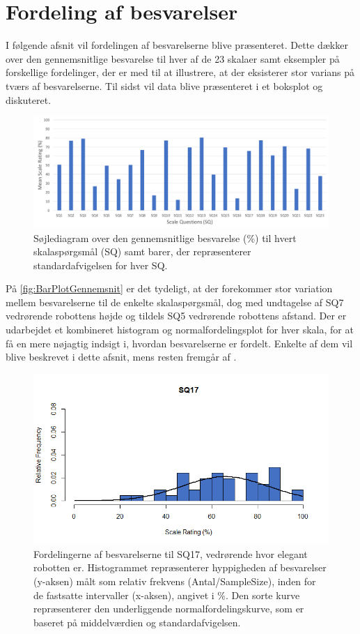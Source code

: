 \section{Fordeling af besvarelser}
\label{TestAfSkalaFordeling}
%
I følgende afsnit vil fordelingen af besvarelserne blive præsenteret. Dette dækker over den gennemsnitlige besvarelse til hver af de 23 skalaer samt eksempler på forskellige fordelinger, der er med til at illustrere, at der eksisterer stor varians på tværs af besvarelserne. Til sidst vil data blive præsenteret i et boksplot og diskuteret.
%
\begin{figure}[H]
\centering
\includegraphics[width = \textwidth]{Figure/DatabehandlingSkalaer/DataPresentation/MeanBarplot} 
 \caption{Søjlediagram over den gennemsnitlige besvarelse (\%) til hvert skalaspørgsmål (SQ) samt barer, der repræsenterer standardafvigelsen for hver SQ.}
\label{fig:BarPlotGennemsnit}
\end{figure}
\noindent
%
På \autoref{fig:BarPlotGennemsnit} er det tydeligt, at der forekommer stor variation mellem besvarelserne til de enkelte skalaspørgsmål, dog med undtagelse af SQ7 vedrørende robottens højde og tildels SQ5 vedrørende robottens afstand. Der er udarbejdet et kombineret histogram og normalfordelingsplot for hver skala, for at få en mere nøjagtig indsigt i, hvordan besvarelserne er fordelt. Enkelte af dem vil blive beskrevet i dette afsnit, mens resten fremgår af .
%
\begin{figure}[H]
\centering
\includegraphics[width = \textwidth]{Figure/DatabehandlingSkalaer/HistogramNormalFordeling/SQ17} 
\caption{Fordelingerne af besvarelserne til SQ17, vedrørende hvor elegant robotten er. Histogrammet repræsenterer hyppigheden af besvarelser (y-aksen) målt som relativ frekvens (Antal/SampleSize), inden for de fastsatte intervaller (x-aksen), angivet i \%. Den sorte kurve repræsenterer den underliggende normalfordelingskurve, som er baseret på middelværdien og standardafvigelsen.}
\label{fig:Histogram17}
\end{figure}

